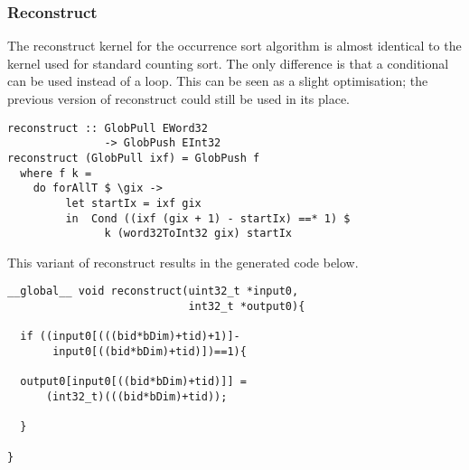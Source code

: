 \subsubsection{Reconstruct} 

The reconstruct kernel for the occurrence sort algorithm  is
almost identical to the kernel used for standard counting sort. The
only difference is that a conditional can be used instead of a loop. 
This can be seen as a slight optimisation; the previous version of reconstruct 
could still be used in its place. 

\begin{small}
\begin{Verbatim}[samepage=true]
reconstruct :: GlobPull EWord32 
               -> GlobPush EInt32
reconstruct (GlobPull ixf) = GlobPush f
  where f k = 
    do forAllT $ \gix ->
         let startIx = ixf gix 
         in  Cond ((ixf (gix + 1) - startIx) ==* 1) $
               k (word32ToInt32 gix) startIx
\end{Verbatim}
\end{small}

This variant of reconstruct results in the generated code below. 

\begin{small}
\begin{Verbatim}[samepage=true]
__global__ void reconstruct(uint32_t *input0,
                            int32_t *output0){
   
  if ((input0[(((bid*bDim)+tid)+1)]-
       input0[((bid*bDim)+tid)])==1){

  output0[input0[((bid*bDim)+tid)]] = 
      (int32_t)(((bid*bDim)+tid));
  
  }

}
\end{Verbatim}
\end{small}





%
%

